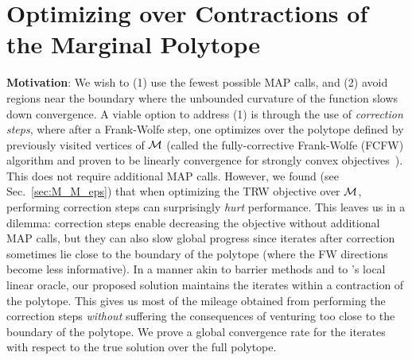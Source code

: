 \vspace{-2mm}
\section{Optimizing over Contractions of the Marginal Polytope}
\vspace{-3mm}

\textbf{Motivation}: 
We wish to (1) use the fewest possible MAP calls, and (2)
avoid regions near the boundary where the unbounded curvature of the function
slows down convergence.  
A viable option to address (1) is through the use of \emph{correction steps}, where after a Frank-Wolfe step, 
one optimizes
over the polytope defined by previously visited vertices of $\mathcal{M}$ (called the fully-corrective
Frank-Wolfe (FCFW) algorithm and proven to be linearly convergence for strongly convex objectives~\citep{lacoste2015MFW}). 
This does not require additional %
MAP calls. 
%
%
However, we found (see Sec.~\ref{sec:M_M_eps}) that when optimizing the TRW objective over $\mathcal{M}$, performing correction steps
can surprisingly \emph{hurt} performance.
%
%
%
%
This leaves us in a dilemma: correction steps 
%
enable decreasing the objective without additional MAP calls,
but they can also slow global progress since iterates after correction
sometimes lie close to the boundary of the polytope (where the FW directions become less informative). 
In a manner akin to barrier methods and to \citet{garber2013linearly}'s
local linear oracle, our proposed solution maintains the iterates within a contraction of the
polytope. This gives us most of the mileage obtained from performing the
correction steps \emph{without} suffering the consequences of venturing too close to the
boundary of the polytope. We prove a global convergence rate for the
iterates with respect to the true solution over the full polytope.
%

